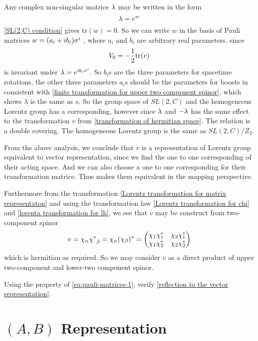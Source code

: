 Any complex non-singular matrice $\lambda$ may be written in the form
\begin{equation}
    \lambda = e^{w}
\end{equation}
 \eqref{SL(2,C) condition} gives $\text{tr}(w) = 0$. So we can write $w$ in the basis of Pauli matrices $w = (a_i+i b_i)\sigma^{i}$ , where $a_i$ and $b_i$ are arbitrary real parameters. since
\begin{equation}
    V_0 = -\frac{1}{2}\text{tr}(v)
\end{equation}
is invariant under $\lambda = e^{i b_i\sigma^{i}}$. So $b_i$s are the three parameters for spacetime rotations, the other three parameters $a_i$s should be the parameters for boosts in consistent with \eqref{finite transformation for upper two component spinor}, which shows $\lambda$ is the same as $s$. So the group space of $SL(2,C)$ and the homogeneous Lorentz group has a corresponding, however since $\lambda$ and $-\lambda$ has the same effect to the transformation $v$ from \eqref{transformation of hermitian space}. The relation is a double covering. The homogeneous Lorentz group is the same as $SL(2,C)/Z_2$.

From the above analysis, we conclude that $v$ is a representation of Lorentz group equivalent to vector representation, since we find the one to one corresponding of their acting space. And we can also choose a one to one corresponding for their transformation matrice. Thus makes them equivalent in the mapping perspective.

Furthermore from the transformation \eqref{Lorentz transformation for matrix representaton} and using the transformation law \eqref{Lorentz transformation for chi} and \eqref{lorenta transformation for lh}, we see that $v$ may be construct from two-component spinor
\begin{equation}
  v = \chi_\a \lc_{\dob}=\chi_\a(\chi_{\be})^*
=\mqty(\chi_1\chi_1^* & \chi_2\chi_1^*
  \\\chi_1\chi_2^* & \chi_2\chi_2^*)
\end{equation}
which is hermitian as required. So we may consider $v$ as a direct product of upper two-component and lower-two component spinor.

\begin{Exe}
Using the property of \eqref{eq:pauli-matrices-1}, verify \eqref{reflection to the vector representation}.
\end{Exe}

\section{$(A,B)$ Representation}

